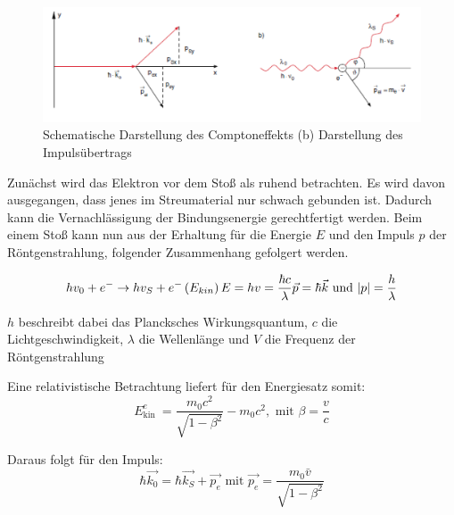 \documentclass[12pt,english,ngerman]{scrartcl}
\begin{document}
\begin{figure}[H]
	\begin{center}
		\includegraphics[width =\textwidth]{./figures/skizze_compton.PNG}
	\end{center}
	\caption[Darstellung des Comptoneffekts]
	{Schematische Darstellung des Comptoneffekts (b) Darstellung des Impulsübertrags
	\cite{unterlagen_compton}
	}\label{fig:skizze_compton}
\end{figure}


Zunächst wird das Elektron vor dem Stoß als ruhend betrachten.
Es wird davon ausgegangen, dass jenes im Streumaterial nur schwach gebunden ist.
Dadurch kann die Vernachlässigung der Bindungsenergie gerechtfertigt werden. Beim einem Stoß
kann nun aus der Erhaltung für die Energie $E$ und den Impuls $p$ der Röntgenstrahlung,
folgender Zusammenhang gefolgert werden.

\begin{equation}
	h v_0+e^{-} \rightarrow h v_S+e^{-}\left(E_{k i n}\right) \\
	E=h v=\frac{\hbar c}{\lambda}\\
	\vec{p}=\hbar \vec{k} \text { und }|p|=\frac{h}{\lambda}
	\label{eq:energie_impuls}
\end{equation}

$h$ beschreibt dabei das Plancksches Wirkungsquantum,
$c$ die Lichtgeschwindigkeit,
$\lambda$ die Wellenlänge und 
$V$ die Frequenz der Röntgenstrahlung

Eine relativistische Betrachtung liefert für den Energiesatz somit:
\begin{equation}
	E_{\text {kin }}^e=\frac{m_0 c^2}{\sqrt{1-\beta^2}}-m_0 c^2, \text { mit } \beta=\frac{v}{c}
\label{eq:energiesatz_relativistisch}
\end{equation}

Daraus folgt für den Impuls:
\begin{equation}
	\hbar \overrightarrow{k_0}=\hbar \overrightarrow{k_S}+\overrightarrow{p_e} \text { mit } \overrightarrow{p_e}=\frac{m_0 \bar{v}}{\sqrt{1-\beta^2}}
\label{eq:impuls_relativistisch}
\end{equation}
\end{document}
